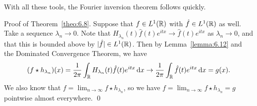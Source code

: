 With all these tools, the Fourier inversion theorem follows quickly. 

{\sc Proof of Theorem~\ref{theo:6.8}.} Suppose that $f \in L^1(\mathbb{R})$ with 
$\hat f \in L^1(\mathbb{R})$ as well. Take a sequence $\lambda_n \to 0$. 
Note that $H_{\lambda_n}(t) \hat f(t) e^{itx} \to \hat f(t) e^{itx}$ 
as $\lambda_n \to 0$, and that this is bounded above by $|\hat f| \in L^1(\mathbb{R})$. 
Then by Lemma~\ref{lemma:6.12} and the Dominated Convergence Theorem, we have 
\[ (f \star h_{\lambda_n})(x) = \frac{1}{2\pi} \int_{\mathbb{R}} H_{\lambda_n}(t) 
\hat f(t) e^{itx} \,\mathrm{d} x \to \frac{1}{2\pi} \int_{\mathbb{R}} \hat f(t) e^{itx} \,\mathrm{d} x = g(x). \]
We also know that $f = \lim_{n\to\infty} f \star h_{\lambda_n}$, so 
we have $f = \lim_{n\to\infty} f \star h_{\lambda_n} = g$ pointwise 
almost everywhere. \qed 
